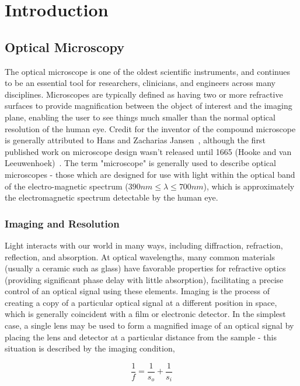 \chapter{Introduction}\label{ch:introduction}

\section{Optical Microscopy}

The optical microscope is one of the oldest scientific instruments, and continues to be an essential tool for researchers, clinicians, and engineers across many disciplines. Microscopes are typically defined as having two or more refractive surfaces to provide magnification between the object of interest and the imaging plane, enabling the user to see things much smaller than the normal optical resolution of the human eye. Credit for the inventor of the compound microscope is generally attributed to Hans and Zacharias Jansen~\cite{van2010origins}, although the first published work on microscope design wasn't released until 1665 (Hooke and van Leeuwenhoek)~\cite{natureMilestones,hookeMicrographica}. The term "microscope" is generally used to describe optical microscopes - those which are designed for use with light within the optical band of the electro-magnetic spectrum ($390nm \leq \lambda \leq 700nm$), which is approximately the electromagnetic spectrum detectable by the human eye.

\subsection{Imaging and Resolution}
Light interacts with our world in many ways, including diffraction, refraction, reflection, and absorption. At optical wavelengths, many common materials (usually a ceramic such as glass) have favorable properties for refractive optics (providing significant phase delay with little absorption), facilitating a precise control of an optical signal using these elements. Imaging is the process of creating a copy of a particular optical signal at a different position in space, which is generally coincident with a film or electronic detector. In the simplest case, a single lens may be used to form a magnified image of an optical signal by placing the lens and detector at a particular distance from the sample - this situation is described by the imaging condition,

\begin{equation}
\frac{1}{f} = \frac{1}{s_o} + \frac{1}{s_i}
\end{equation}

